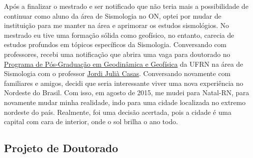 \documentclass[10pt,a4paper,oneside]{book}
\begin{document}
Após a finalizar o mestrado e ser notificado que não teria mais a possibilidade de continuar como aluno da área de Sismologia no ON, optei por mudar de instituição para me manter na área e aprimorar os estudos sismológios. No mestrado eu tive uma formação sólida como geofísico, no entanto, carecia de estudos profundos em tópicos específicos da Sismologia. Conversando com professores, recebi uma notificação que abrira uma vaga para doutorado no \href{https://posgraduacao.ufrn.br/325}{Programa de Pós-Graduação em Geodinâmica e Geofísica} da UFRN na área de Sismologia com o professor \href{http://lattes.cnpq.br/0012168139768170}{Jordi Julià Casas}. Conversando novamente com familiares e amigos, decidi que seria interessante viver uma nova experiência no Nordeste do Brasil. Com isso, em agosto de 2015, me mudei para Natal-RN, para novamente mudar minha realidade, indo para uma cidade localizada no extremo nordeste do país. Realmente, foi uma decisão acertada, pois a cidade é uma capital com cara de interior, onde o sol brilha o ano todo. 

\subsection{Projeto de Doutorado}
\label{sec_proj_doc}
\end{document}
